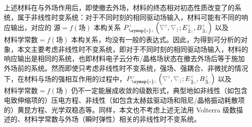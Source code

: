 上述材料在与外场作用后，即使撤去外场，材料的终态相对初态性质改变了的系统，属于非线性时变系统：对于不同时刻的相同驱动场输入，材料可能有不同的响应输出，对应的 $\text{源} = f(\text{场})$ 本构关系 $P^{\;\!\mathcolor{gray}{t}}_{\;\! \symup{\iota}\mathcolor{gray}{z}} \left( \mathcolor{gray}{\nabla^t}, \mathcolor{gray}{\nabla_{\hat{1}}} ; E^{\;\!\mathcolor{gray}{t}}_{\;\! \hat{2}\mathcolor{gray}{z}}, B^{\;\!\mathcolor{gray}{t}}_{\;\! \hat{3}\mathcolor{gray}{z}} \right)$ 以及 $\text{材料学常数} = f(\text{场})$ 本构关系，均没有一般的表达式。因此，为得到可分析的对象，本文主要考虑非线性时不变系统\cite{zalevskyOpticalImplementationSecondorder2001}，即对于不同时刻的相同驱动场输入，材料的响应输出是相同的系统，也即材料电子云分布/晶格场状态在撤去外场后等于施加外场前的系统。然而即使只考虑非线性时不变系统，强场、强耦合、非微扰的情况下，在材料与场的强相互作用的过程中，$P^{\;\!\mathcolor{gray}{t}}_{\;\! \symup{\iota}\mathcolor{gray}{z}} \left( \mathcolor{gray}{\nabla^t}, \mathcolor{gray}{\nabla_{\hat{1}}} ; E^{\;\!\mathcolor{gray}{t}}_{\;\! \hat{2}\mathcolor{gray}{z}}, B^{\;\!\mathcolor{gray}{t}}_{\;\! \hat{3}\mathcolor{gray}{z}} \right)$ 以及 $\text{材料学常数} = f(\text{场})$ 仍不一定能展成收敛的级数形式，典型地如非线性（如包含电致伸缩项的）压电方程、非线性（如包含太赫兹驱动场和阻尼/晶格振动耗散项的）黄昆方程\cite{wuqiangShouJiShengZiJiHuaJiYuanYuTaiHeZiGuangWuLiTeYao2024}、光学双稳态\cite{boydNonlinearOptics2019}等。同样，本文也不考虑上述无法用 Volterra 级数\cite{pintoExactVolterraseriesComputation1982,shenNonlinearOpticalSusceptibilities2001}描述的、材料学常数与外场（瞬时弹性）相关的非线性时不变系统。

